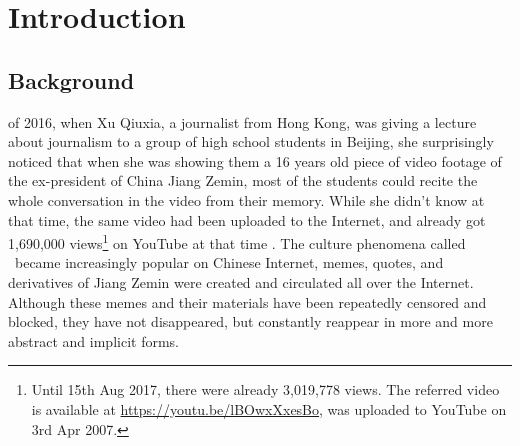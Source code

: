 \chapter{Introduction}

\section{Background}
 of 2016, when Xu Qiuxia, a journalist from Hong Kong, was giving a lecture about journalism to a group of high school students in Beijing, she surprisingly noticed that when she was showing them a 16 years old piece of video footage of the ex-president of China Jiang Zemin, most of the students could recite the whole conversation in the video from their memory. While she didn't know at that time, the same video had been uploaded to the Internet, and already got 1,690,000 views\footnote{Until 15th Aug 2017, there were already 3,019,778 views. The referred video is available at \url{https://youtu.be/lBOwxXxesBo}, was uploaded to YouTube on 3rd Apr 2007.} on YouTube at that time \citep{__2016-2}. The culture phenomena called \moha\ became increasingly popular on Chinese Internet, memes, quotes, and derivatives of Jiang Zemin were created and circulated all over the Internet. Although these memes and their materials have been repeatedly censored and blocked, they have not disappeared, but constantly reappear in more and more abstract and implicit forms.

